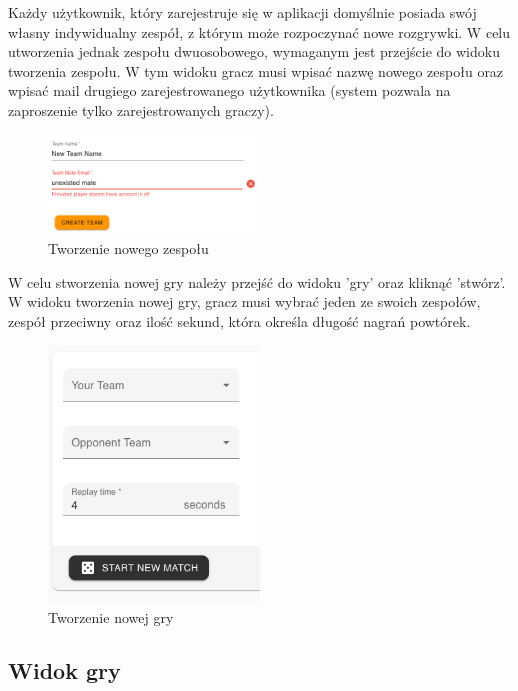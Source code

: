 Każdy użytkownik, który zarejestruje się w aplikacji domyślnie posiada swój własny indywidualny zespół, z którym może rozpoczynać nowe rozgrywki. W celu utworzenia jednak zespołu dwuosobowego, wymaganym jest przejście do widoku tworzenia zespołu. W tym widoku gracz musi wpisać nazwę nowego zespołu oraz wpisać mail drugiego zarejestrowanego użytkownika (system pozwala na zaproszenie tylko zarejestrowanych graczy).

\begin{figure}[h!]
  \centering
    \includegraphics[width=0.5\textwidth]{images/player/creating-team.png}
  \caption{Tworzenie nowego zespołu}
  \label{fig:mobile}
\end{figure}

W celu stworzenia nowej gry należy przejść do widoku 'gry' oraz kliknąć 'stwórz'. W widoku tworzenia nowej gry, gracz musi wybrać jeden ze swoich zespołów, zespół przeciwny oraz ilość sekund, która określa długość nagrań powtórek.

\begin{figure}[h!]
  \centering
    \includegraphics[width=0.5\textwidth]{images/player/create-match.png}
  \caption{Tworzenie nowej gry}
  \label{fig:mobile}
\end{figure}

\subsection{Widok gry}

